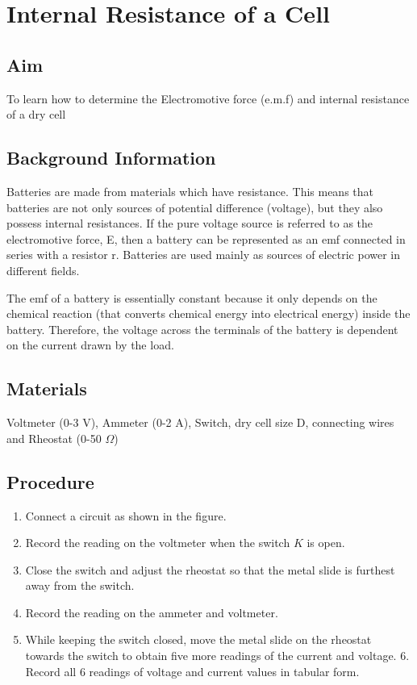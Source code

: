 \chapter{Internal Resistance of a Cell}

\section{Aim}
To learn how to determine the Electromotive force (e.m.f) and internal resistance of a dry cell

\section{Background Information}
Batteries are made from materials which have resistance. This means that batteries are not only sources of potential difference (voltage), but they also possess internal resistances. If the pure voltage source is referred to as the electromotive force, E, then a battery can be represented as an emf connected in series with a resistor r. Batteries are used mainly as sources of electric power in different fields. 

The emf of a battery is essentially constant because it only depends on the chemical reaction (that converts chemical energy into electrical energy) inside the battery. Therefore, the voltage across the terminals of the battery is dependent on the current drawn by the load.

\section{Materials}
Voltmeter (0-3 V), Ammeter (0-2 A), Switch, dry cell size D, connecting wires and Rheostat (0-50 $\Omega$)

\section{Procedure}
\begin{enumerate}
\item Connect a circuit as shown in the figure.
\item Record the reading on the voltmeter when the switch $K$ is open.
\item Close the switch and adjust the rheostat so that the metal slide is furthest away from the switch.
\item Record the reading on the ammeter and voltmeter.
\item While keeping the switch closed, move the metal slide on the rheostat towards the switch to obtain five more readings of the current and voltage.
6.	Record all 6 readings of voltage and current values in tabular form.
\end{enumerate}

